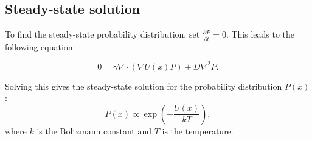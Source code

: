 \documentclass{article}
\theoremstyle{definition} \newtheorem{definition}{Definition}
\theoremstyle{remark} \newtheorem{remark}{Remark}
\newcounter{ct}
\begin{document}
\subsection{Steady-state solution}
To find the steady-state probability distribution, set $\frac{\partial P}{\partial t} = 0$. This leads to the following equation:

\begin{equation}
    0 = \gamma \nabla \cdot \left( \nabla U(x) P \right) + D \nabla^2 P.
\end{equation}

Solving this gives the steady-state solution for the probability distribution $P(x)$:
\begin{equation}
    P(x) \propto \exp \left( - \frac{U(x)}{kT} \right),
\end{equation}
where $k$ is the Boltzmann constant and $T$ is the temperature.
\end{document}
